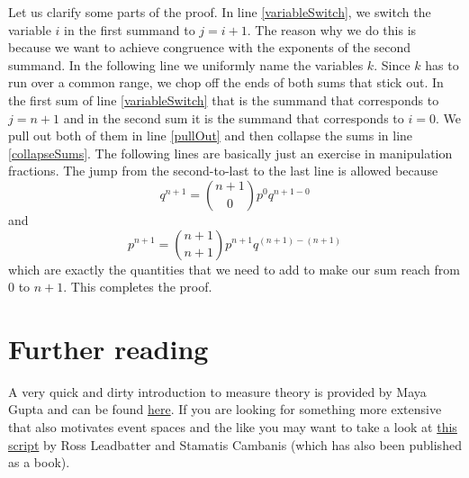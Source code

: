 \documentclass[a4paper,11pt,leqno]{report}
\begin{document}
Let us clarify some parts of the proof. In line \ref{variableSwitch}, we switch the variable $ i $ in the first summand to $ j = i+1 $. The
reason why we do this is because we want to achieve congruence with the exponents of the second summand. In the following line we 
uniformly name the variables $ k $. Since $ k $ has to run over a common range, we chop off the ends of both sums that stick out. In the first
sum of line \ref{variableSwitch} that is the summand that corresponds to $ j=n+1 $ and in the second sum it is the summand that corresponds
to $ i = 0 $. We pull out both of them in line \ref{pullOut} and then collapse the sums in line \ref{collapseSums}. The following lines 
are basically just an exercise in manipulation fractions. The jump from the second-to-last to the last line is allowed because
$$ q^{n+1} = \binom{n+1}{0}p^{0}q^{n+1-0} $$ and $$ p^{n+1} = \binom{n+1}{n+1}p^{n+1}q^{(n+1)-(n+1)} $$
which are exactly the quantities that we need to add to make our sum reach from $ 0 $ to $ n+1 $. This completes the proof.

\section*{Further reading}
A very quick and dirty introduction to measure theory is provided by Maya Gupta and can be found 
\href{https://www.ee.washington.edu/techsite/papers/documents/UWEETR-2006-0008.pdf}{here}. If you are
looking for something more extensive that also motivates event spaces and the like you may want to 
take a look at \href{http://www.stat.ncsu.edu/people/fuentes/courses/st778/lectures/ross}{this script}
by Ross Leadbatter and Stamatis Cambanis (which has also been published as a book).
\end{document}
